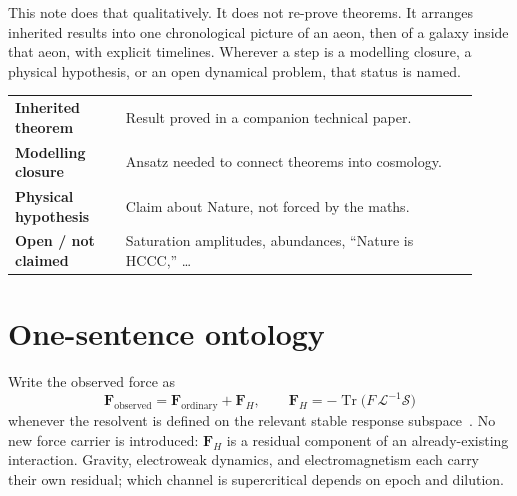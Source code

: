 \documentclass[11pt]{article}
\newcommand{\FH}{\mathbf F_{\!H}}
\begin{document}
This note does that qualitatively.
It does not re-prove theorems.
It arranges inherited results into one chronological picture of an aeon, then of a
galaxy inside that aeon, with explicit timelines.
Wherever a step is a modelling closure, a physical hypothesis, or an open dynamical
problem, that status is named.

\begin{center}
\small
\begin{tabular}{@{}>{\bfseries}p{0.22\linewidth}p{0.70\linewidth}@{}}
\toprule
Inherited theorem & Result proved in a companion technical paper.\\
Modelling closure & Ansatz needed to connect theorems into cosmology.\\
Physical hypothesis & Claim about Nature, not forced by the maths.\\
Open / not claimed & Saturation amplitudes, abundances, ``Nature is HCCC,'' \ldots\\
\bottomrule
\end{tabular}
\end{center}

\section{One-sentence ontology}
\label{sec:ontology}
Write the observed force as
\begin{equation}
\label{eq:FH}
\boxed{\mathbf F_{\mathrm{observed}}=\mathbf F_{\mathrm{ordinary}}+\FH,}
\qquad
\FH=-\operatorname{Tr}\!\bigl(F\,\mathcal L^{-1}\mathcal S\bigr)
\end{equation}
whenever the resolvent is defined on the relevant stable response
subspace~\cite{boyd2026response}.
No new force carrier is introduced: $\FH$ is a residual component of an
already-existing interaction.
Gravity, electroweak dynamics, and electromagnetism each carry their own residual;
which channel is supercritical depends on epoch and dilution.
\end{document}
